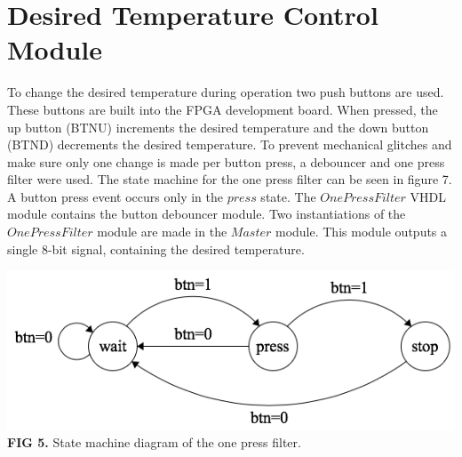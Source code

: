 \documentclass{article}
\begin{document}
\section{Desired Temperature Control Module}
To change the desired temperature during operation two push buttons are used. These buttons are built into the FPGA development board. When pressed, the up button (BTNU) increments the desired temperature and the down button (BTND) decrements the desired temperature. To prevent mechanical glitches and make sure only one change is made per button press, a debouncer and one press filter were used. The state machine for the one press filter can be seen in figure 7. A button press event occurs only in the $press$ state. The $OnePressFilter$ VHDL module contains the button debouncer module. Two instantiations of the $OnePressFilter$ module are made in the $Master$ module. This module outputs a single 8-bit signal, containing the desired temperature.
\begin{center}
\includegraphics[scale=.5]{images/nopressMachine}\\
\textbf{FIG 5.} State machine diagram of the one press filter.\\
\end{center}
\end{document}

